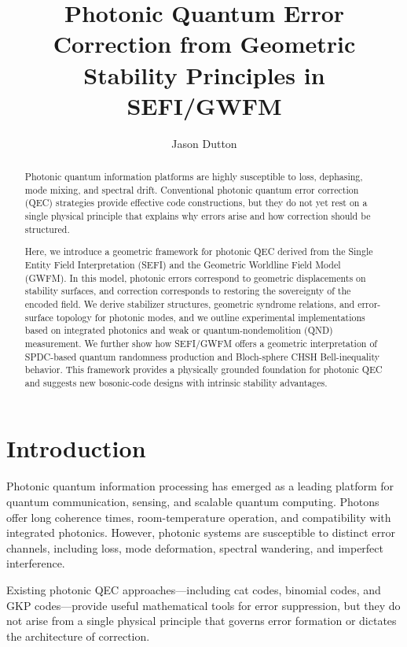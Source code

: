 \documentclass[aip, reprint, superscriptaddress]{revtex4-2}
\begin{document}
\title{Photonic Quantum Error Correction from Geometric Stability Principles in SEFI/GWFM}

\author{Jason Dutton}

\begin{abstract}
Photonic quantum information platforms are highly susceptible to loss, dephasing, mode 
mixing, and spectral drift. Conventional photonic quantum error correction (QEC) 
strategies provide effective code constructions, but they do not yet rest on a single 
physical principle that explains why errors arise and how correction should be structured.

Here, we introduce a geometric framework for photonic QEC derived from the Single 
Entity Field Interpretation (SEFI) and the Geometric Worldline Field Model (GWFM). In 
this model, photonic errors correspond to geometric displacements on stability surfaces, 
and correction corresponds to restoring the sovereignty of the encoded field. We derive 
stabilizer structures, geometric syndrome relations, and error-surface topology for 
photonic modes, and we outline experimental implementations based on integrated 
photonics and weak or quantum-nondemolition (QND) measurement. We further show 
how SEFI/GWFM offers a geometric interpretation of SPDC-based quantum randomness 
production and Bloch-sphere CHSH Bell-inequality behavior. This framework provides a 
physically grounded foundation for photonic QEC and suggests new bosonic-code designs 
with intrinsic stability advantages.
\end{abstract}

\maketitle

\section{Introduction}

Photonic quantum information processing has emerged as a leading platform for quantum 
communication, sensing, and scalable quantum computing. Photons offer long coherence 
times, room-temperature operation, and compatibility with integrated photonics. However, 
photonic systems are susceptible to distinct error channels, including loss, mode 
deformation, spectral wandering, and imperfect interference.

Existing photonic QEC approaches---including cat codes, binomial codes, and GKP 
codes---provide useful mathematical tools for error suppression, but they do not arise 
from a single physical principle that governs error formation or dictates the architecture 
of correction.
\end{document}
